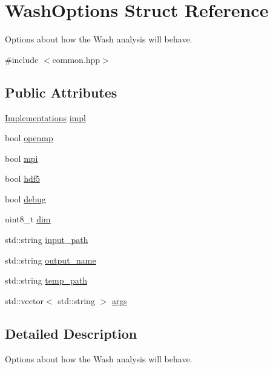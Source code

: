 \hypertarget{structWashOptions}{}\section{Wash\+Options Struct Reference}
\label{structWashOptions}


Options about how the Wash analysis will behave.  




{\ttfamily \#include $<$common.\+hpp$>$}

\subsection*{Public Attributes}
\begin{DoxyCompactItemize}
\item 
\mbox{\hyperlink{common_8hpp_aad9d1428f17c06ff77ef15dea22624dc}{Implementations}} \mbox{\hyperlink{structWashOptions_a44a1b923dc5034a3bf45dee2f54623ca}{impl}}
\item 
bool \mbox{\hyperlink{structWashOptions_a50d97883a6c0eaf8bafda97f5bad2a1e}{openmp}}
\item 
bool \mbox{\hyperlink{structWashOptions_a9ec267278d89d04982e3d70e877d5c67}{mpi}}
\item 
bool \mbox{\hyperlink{structWashOptions_a31ed802896363b97ac1f5199a6940df9}{hdf5}}
\item 
bool \mbox{\hyperlink{structWashOptions_a5bc365ad8fc0544864d15709b6808843}{debug}}
\item 
uint8\+\_\+t \mbox{\hyperlink{structWashOptions_a0caa33c545fc380c4104ca90f6462dfb}{dim}}
\item 
std\+::string \mbox{\hyperlink{structWashOptions_a4b43b8f0700908a6975a367d2cb9d567}{input\+\_\+path}}
\item 
std\+::string \mbox{\hyperlink{structWashOptions_a091c31f0eee54c7b079268f7a1001547}{output\+\_\+name}}
\item 
std\+::string \mbox{\hyperlink{structWashOptions_a27f59d7e66cdf80f0fe5cc5e699b0953}{temp\+\_\+path}}
\item 
std\+::vector$<$ std\+::string $>$ \mbox{\hyperlink{structWashOptions_abc32ad74441fbc82069b4addc130d4cd}{args}}
\end{DoxyCompactItemize}


\subsection{Detailed Description}
Options about how the Wash analysis will behave. 

